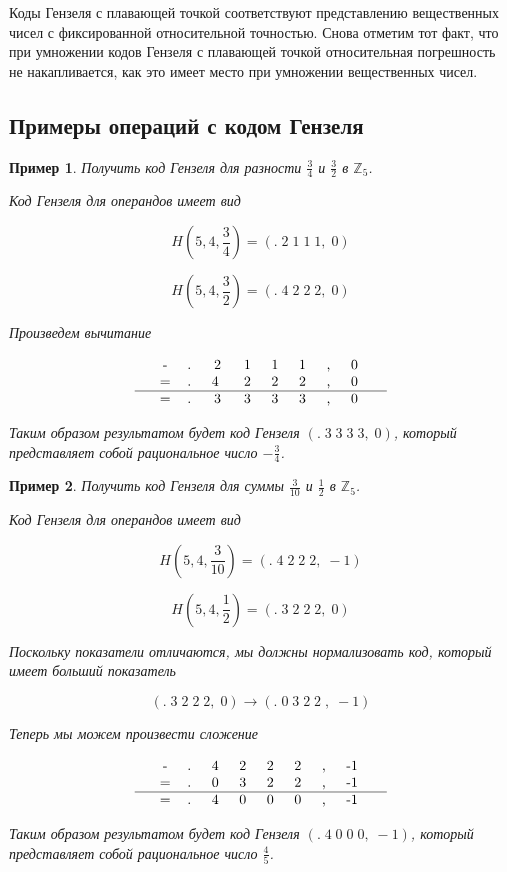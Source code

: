 \documentclass[master, och, diploma, times]{sty/SCWorks}
\theoremstyle{plain}
\newtheorem{exmp}{Пример}[section]
\theoremstyle{definition}
\begin{document}
Коды Гензеля с плавающей точкой соответствуют представлению вещественных чисел с фиксированной относительной точностью. Снова отметим тот факт, что при умножении кодов Гензеля с плавающей точкой относительная погрешность не накапливается, как это имеет место при умножении вещественных чисел.


\subsection{Примеры операций с кодом Гензеля}

\begin{exmp}
Получить код Гензеля для разности $\frac{3}{4}$ и $\frac{3}{2}$ в $\mathbb{Z}_5$.

\noindent Код Гензеля для операндов имеет вид

$$H(5,4, \frac{3}{4})=(.\; 2\; 1\; 1\; 1,\; 0)$$

$$H(5,4, \frac{3}{2})=(.\; 4\; 2\; 2\; 2,\; 0)$$


\noindent Произведем вычитание

$$
\begin{tabular}{ccccccccccc}
& - & .\; & 2\; & 1\; & 1\; & 1\; & ,\; & 0\; &  \\
& = & .\; & 4 \; & 2\; & 2\; & 2\; & ,\; & 0\; &  \\
\hline
& = & .\; & 3\; & 3\; & 3\; & 3\; & ,\; & 0\; &
\end{tabular}
$$


\noindent Таким образом результатом будет код Гензеля $(.\; 3\; 3\; 3\; 3,\; 0)$, который представляет собой рациональное число $-\frac{3}{4}$.
\end{exmp}


\begin{exmp}
Получить код Гензеля для суммы $\frac{3}{10}$ и $\frac{1}{2}$ в $\mathbb{Z}_5$.

\noindent Код Гензеля для операндов имеет вид

$$H(5,4, \frac{3}{10})=(.\; 4\; 2\; 2\; 2,\; -1)$$

$$H(5,4, \frac{1}{2})=(.\; 3\; 2\; 2\; 2,\; 0)$$


\noindent Поскольку показатели отличаются, мы должны нормализовать код, который имеет больший показатель

$$ 
(.\; 3\; 2\; 2\; 2,\; 0) \rightarrow (.\; 0 \; 3\; 2\; 2\; ,\; -1)
$$

\noindent Теперь мы можем произвести сложение

$$
\begin{tabular}{ccccccccccc}
& - & .\; & 4\; & 2\; & 2\; & 2\; & ,\; & -1\; &  \\
& = & .\; & 0\; & 3\; & 2\; & 2\; & ,\; & -1\; &  \\
\hline
& = & .\; & 4\; & 0\; & 0\; & 0\; & ,\; & -1\; &
\end{tabular}
$$


\noindent Таким образом результатом будет код Гензеля $(.\; 4\; 0\; 0\; 0,\; -1)$, который представляет собой рациональное число $\frac{4}{5}$.
\end{exmp}
\end{document}
